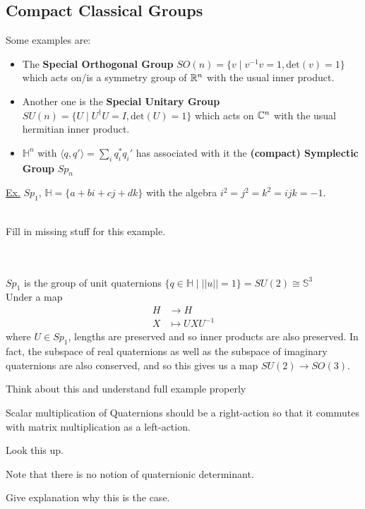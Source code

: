 \documentclass[11pt]{article}
\begin{document}
\subsection{Compact Classical Groups}
Some examples are:
\begin{itemize}
  \item The \textbf{Special Orthogonal Group} $SO(n) = \{v\;|\;v^{-1}v = 1, \mathrm{det}(v) = 1\}$ which acts on/is a symmetry group of $\mathbb{R}^n$ with the usual inner product.
  \item Another one is the \textbf{Special Unitary Group} $SU(n) = \{U \;|\; U^{\dagger}U = I, \mathrm{det}(U) = 1\}$ which acts on $\mathbb{C}^n$ with the usual hermitian inner product.
  \item $\mathbb{H}^n$ with $\langle q, q' \rangle= \sum_{i} q_i^* q_i'$ has associated with it the \textbf{(compact) Symplectic Group} $Sp_n$
\end{itemize} \underline{Ex.} $Sp_1$, $\mathbb{H} = \{ a + bi + cj + dk \}$ with the algebra $i^2 = j^2 = k^2 = ijk = -1$. 
\\
\\
\begin{note}
  {Fill in missing stuff for this example.}
\end{note}
\\
\\
$Sp_1$ is the group of unit quaternions $\{q \in \mathbb{H}\;|\; ||u|| = 1 \} = SU(2) \cong \mathbb{S}^3$
\\
Under a map 
\begin{align*}
  H &\rightarrow H \\
  X &\mapsto U X U^{-1}
\end{align*}
where $U \in Sp_1$, lengths are preserved and so  inner products are also preserved. In fact, the subspace of real quaternions as well as the subspace of imaginary quaternions are also conserved, and so this gives us a map $SU(2) \rightarrow SO(3)$. \begin{note}
  {Think about this and understand full example properly}
\end{note} Scalar multiplication of Quaternions should be a right-action so that it commutes with matrix multiplication as a left-action. \begin{note}
  {Look this up.}
\end{note}

\begin{remark}
  Note that there is no notion of quaternionic determinant. \begin{note}
    {Give explanation why this is the case.}
  \end{note}
\end{remark}
\end{document}
